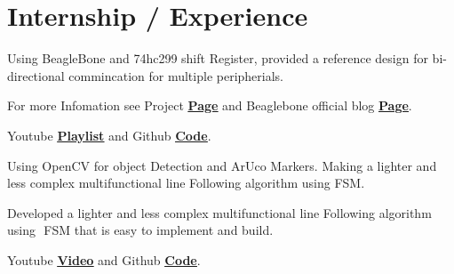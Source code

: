 \documentclass[]{font}
\begin{document}
\hfill
\begin{minipage}[t]{0.69\textwidth} 


\section{Internship / Experience}
\vspace{\topsep} %

\vspace{\topsep} %
\begin{tightemize}
\item Using BeagleBone and 74hc299 shift Register, provided a reference design for bi-directional commincation for multiple peripherials.
\item For more Infomation see Project \textbf{\href{https://elinux.org/Beagleboard_gsoc_2019_bi-directional_progress}{\underline{Page}}} and Beaglebone official blog \textbf{\href{https://beagleboard.org/blog/2019-06-02-beagleboard-org-community-kicks-off-gsoc-2019-with-four-projects}{\underline{Page}}}.
\item Youtube \textbf{\href{https://www.youtube.com/watch?v=ZZDT6jNslqw&list=PLttoix_9Us2yHM4zNr08ynm4iwXZTgxam}{\underline{Playlist}}} and Github \textbf{\href{https://github.com/pranav083/pocket_beagle-work}{\underline{Code}}}. 
\end{tightemize}
\sectionsep


\begin{tightemize}

\item Using OpenCV for object Detection and ArUco Markers. Making a lighter and less complex multifunctional line Following algorithm using FSM.
\item Developed a lighter and less complex multifunctional line Following algorithm
using​ ​ FSM​ that is easy to implement and build.
\item Youtube \textbf{\href{https://youtu.be/FhUvQlrLWxc}{\underline{Video}}} and Github \textbf{\href{https://github.com/pranav083/FSM_code}{\underline{Code}}}. 
\end{tightemize}
\sectionsep



\end{minipage}
\end{document}
